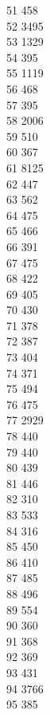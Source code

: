 { 51	458 \\
 52	3495 \\
 53	1329 \\
 54	395 \\
 55	1119 \\
 56	468 \\
 57	395 \\
 58	2006 \\
 59	510 \\
 60	367 \\
 61	8125 \\
 62	447 \\
 63	562 \\
 64	475 \\
 65	466 \\
 66	391 \\
 67	475 \\
 68	422 \\
 69	405 \\
 70	430 \\
 71	378 \\
 72	387 \\
 73	404 \\
 74	371 \\
 75	494 \\
 76	475 \\
 77	2929 \\
 78	440 \\
 79	440 \\
 80	439 \\
 81	446 \\
 82	310 \\
 83	533 \\
 84	316 \\
 85	450 \\
 86	410 \\
 87	485 \\
 88	496 \\
 89	554 \\
 90	360 \\
 91	368 \\
 92	369 \\
 93	431 \\
 94	3766 \\
 95	385 \\
}
